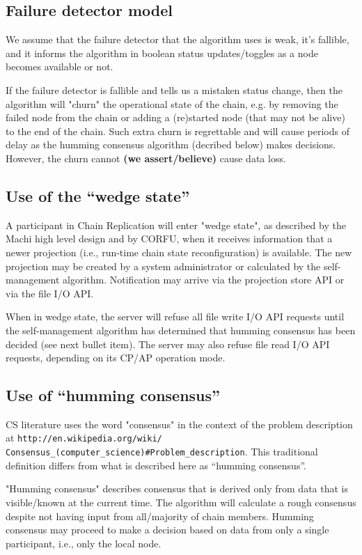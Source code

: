 \documentclass[preprint,10pt]{sigplanconf}
\begin{document}
\subsection{Failure detector model}

We assume that the failure detector that the algorithm uses is weak,
it's fallible, and it informs the algorithm in boolean status
updates/toggles as a node becomes available or not.

If the failure detector is fallible and tells us a mistaken status
change, then the algorithm will "churn" the operational state of the
chain, e.g. by removing the failed node from the chain or adding a
(re)started node (that may not be alive) to the end of the chain.
Such extra churn is regrettable and will cause periods of delay as the
humming consensus algorithm (decribed below) makes decisions.  However, the
churn cannot {\bf (we assert/believe)} cause data loss.

\subsection{Use of the ``wedge state''}

A participant in Chain Replication will enter "wedge state", as
described by the Machi high level design \cite{machi-design} and by CORFU,
when it receives information that
a newer projection (i.e., run-time chain state reconfiguration) is
available.  The new projection may be created by a system
administrator or calculated by the self-management algorithm.
Notification may arrive via the projection store API or via the file
I/O API.

When in wedge state, the server will refuse all file write I/O API
requests until the self-management algorithm has determined that
humming consensus has been decided (see next bullet item).  The server
may also refuse file read I/O API requests, depending on its CP/AP
operation mode.

\subsection{Use of ``humming consensus''}

CS literature uses the word "consensus" in the context of the problem
description at
{\tt http://en.wikipedia.org/wiki/ Consensus\_(computer\_science)\#Problem\_description}.
This traditional definition differs from what is described here as
``humming consensus''.

"Humming consensus" describes
consensus that is derived only from data that is visible/known at the current
time.
The algorithm will calculate
a rough consensus despite not having input from all/majority
of chain members.  Humming consensus may proceed to make a
decision based on data from only a single participant, i.e., only the local
node.
\end{document}
